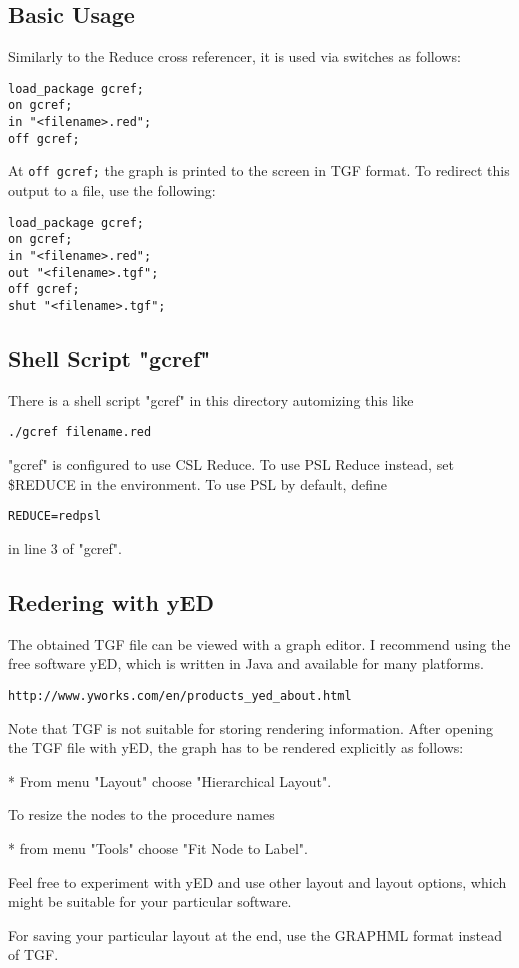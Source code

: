 
\subsection{Basic Usage}


Similarly to the Reduce cross referencer, it is used via switches as follows:
\begin{verbatim}
load_package gcref;
on gcref;
in "<filename>.red";
off gcref;
\end{verbatim}
At \texttt{off gcref;} the graph is printed to the screen in TGF format. 
To redirect this output to a file, use the following:
\begin{verbatim}
load_package gcref;
on gcref;
in "<filename>.red";
out "<filename>.tgf";
off gcref;
shut "<filename>.tgf";
\end{verbatim}

\subsection{Shell Script "gcref"}

There is a shell script "gcref" in this directory automizing this like
\begin{verbatim}
./gcref filename.red
\end{verbatim}
"gcref" is configured to use CSL Reduce. To use PSL Reduce instead, set
\$REDUCE in the environment. To use PSL by default, define
\begin{verbatim}
REDUCE=redpsl
\end{verbatim}
in line 3 of "gcref".


\subsection{Redering with yED}

The obtained TGF file can be viewed with a graph editor. I recommend using the
free software yED, which is written in Java and available for many platforms.
\begin{verbatim}
http://www.yworks.com/en/products_yed_about.html
\end{verbatim}
Note that TGF is not suitable for storing rendering information. After opening
the TGF file with yED, the graph has to be rendered explicitly as follows:

* From menu "Layout" choose "Hierarchical Layout".

To resize the nodes to the procedure names

* from menu "Tools" choose "Fit Node to Label".

Feel free to experiment with yED and use other layout and layout options, which
might be suitable for your particular software.

For saving your particular layout at the end, use the GRAPHML format instead of
TGF.
